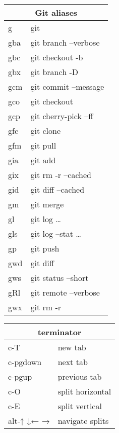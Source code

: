 \documentclass[12pt,paper=landscape,paper=a4]{scrartcl}
\begin{document}
\pagestyle{empty}
\pagecolor{gruvbox_bg} %
\color{gruvbox_fg}

\begin{multicols}{3}

    \begin{tabular}{ll}
        \multicolumn{2}{c}{Git aliases} \\
        \hline
        g    & git\\
        gba  & git branch --verbose\\
        gbc  & git checkout -b\\
        gbx  & git branch -D\\
        gcm  & git commit --message\\
        gco  & git checkout\\
        gcp  & git cherry-pick --ff\\
        gfc  & git clone\\
        gfm  & git pull\\
        gia  & git add\\
        gix  & git rm -r --cached\\
        gid  & git diff --cached\\
        gm   & git merge\\
        gl   & git log \ldots\\
        gls  & git log --stat \ldots\\
        gp   & git push\\
        gwd  & git diff\\
        gws  & git status --short\\
        gRl  & git remote --verbose\\
        gwx  & git rm -r
    \end{tabular}

    \vspace{1em}

    \begin{tabular}{ll}
        \multicolumn{2}{c}{terminator}\\
        \hline
        c-T     & new tab\\
        c-pgdown & next tab\\
        c-pgup  & previous tab\\
        c-O     & split horizontal\\
        c-E     & split vertical\\
        alt-↑ ↓← → & navigate splits
    \end{tabular}


\end{multicols}
\end{document}

